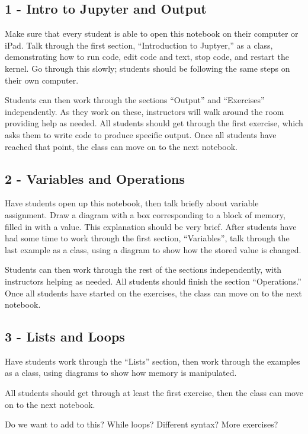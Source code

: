 \documentclass[11pt]{article}
\begin{document}
\subsection*{1 - Intro to Jupyter and Output}

Make sure that every student is able to open this notebook on their computer or iPad. Talk through the first section, ``Introduction to Juptyer,'' as a class, demonstrating how to run code, edit code and text, stop code, and restart the kernel. Go through this slowly; students should be following the same steps on their own computer.

Students can then work through the sections ``Output'' and ``Exercises'' independently. As they work on these, instructors will walk around the room providing help as needed. All students should get through the first exercise, which asks them to write code to produce specific output. Once all students have reached that point, the class can move on to the next notebook. 

\subsection*{2 - Variables and Operations}

Have students open up this notebook, then talk briefly about variable assignment. Draw a diagram with a box corresponding to a block of memory, filled in with a value. This explanation should be very brief. After students have had some time to work through the first section, ``Variables'', talk through the last example as a class, using a diagram to show how the stored value is changed.

Students can then work through the rest of the sections independently, with instructors helping as needed. All students should finish the section ``Operations.'' Once all students have started on the exercises, the class can move on to the next notebook.

\subsection*{3 - Lists and Loops}

Have students work through the ``Lists'' section, then work through the examples as a class, using diagrams to show how memory is manipulated.

All students should get through at least the first exercise, then the class can move on to the next notebook.

{\color{red} Do we want to add to this? While loops? Different syntax? More exercises?}
\end{document}
